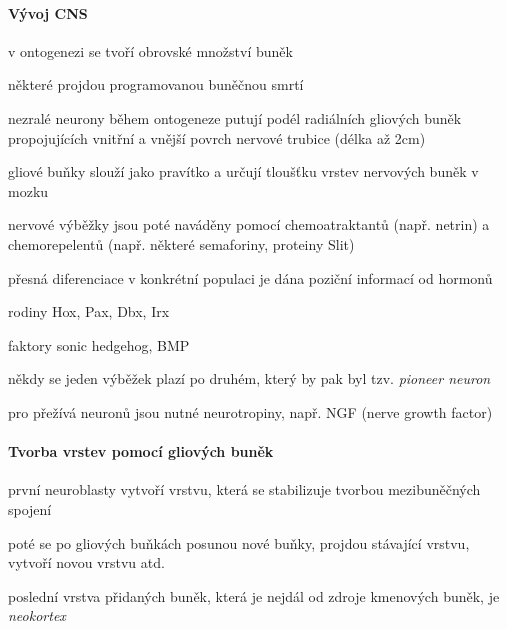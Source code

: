 \documentclass[DIV=8]{scrreprt}
\begin{document}
\paragraph{Vývoj CNS}
\begin{myEnumerate}[nosep]
    \item v ontogenezi se tvoří obrovské množství buněk
\begin{myItemize}[nosep]
    \item některé projdou programovanou buněčnou smrtí
\end{myItemize}

    \item nezralé neurony během ontogeneze putují podél radiálních gliových buněk propojujících vnitřní  a vnější povrch nervové trubice (délka až 2cm)
\begin{myItemize}[nosep]
    \item gliové buňky slouží jako pravítko a určují tloušťku vrstev nervových buněk v mozku
\end{myItemize}

    \item nervové výběžky jsou poté naváděny pomocí chemoatraktantů (např. netrin) a chemorepelentů (např. některé semaforiny, proteiny Slit)
\begin{myItemize}[nosep]
    \item přesná diferenciace v konkrétní populaci je dána poziční informací od hormonů
\begin{myItemize}[nosep]
    \item rodiny Hox, Pax, Dbx, Irx
    \item faktory sonic hedgehog, BMP
\end{myItemize}

    \item někdy se jeden výběžek plazí po druhém, který by pak byl tzv. \emph{pioneer neuron}
\end{myItemize}

    \item pro přežívá neuronů jsou nutné neurotropiny, např. NGF (nerve growth factor)
\end{myEnumerate}



\paragraph{Tvorba vrstev pomocí gliových buněk}
\begin{myEnumerate}[nosep]
    \item první neuroblasty vytvoří vrstvu, která se stabilizuje tvorbou mezibuněčných spojení
    \item poté se po gliových buňkách posunou nové buňky, projdou stávající vrstvu, vytvoří novou vrstvu atd.
    \item poslední vrstva přidaných buněk, která je nejdál od zdroje kmenových buněk, je \emph{neokortex}
\end{myEnumerate}
\end{document}
